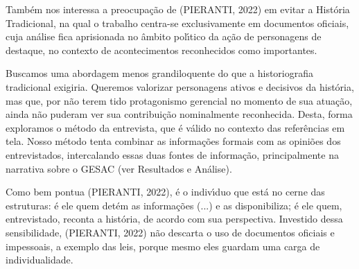 \documentclass[
12pt,		%
openright,	%
twoside,  %
a4paper,			%
chapter=TITLE,		%
english,			%
french,				%
spanish,			%
brazil				%
]{USPSC-classe/USPSC}
\begin{document}
Tamb\'em nos interessa a preocupa\c{c}\~ao de (PIERANTI, 2022) em evitar a Hist\'oria Tradicional, na qual o trabalho centra-se exclusivamente em documentos oficiais, cuja an\'alise fica aprisionada no \^ambito pol\'{\i}tico da a\c{c}\~ao de \textquotedbl personagens de destaque\textquotedbl , no contexto de \textquotedbl acontecimentos reconhecidos como importantes\textquotedbl .

















Buscamos uma abordagem menos grandiloquente do que a historiografia tradicional exigiria. Queremos valorizar personagens ativos e decisivos da hist\'oria, mas que, por n\~ao terem tido protagonismo gerencial no momento de sua atua\c{c}\~ao, ainda n\~ao puderam ver sua contribui\c{c}\~ao nominalmente reconhecida. Desta, forma exploramos o m\'etodo da entrevista, que \'e v\'alido no contexto das refer\^encias em tela. Nosso m\'etodo tenta combinar as informa\c{c}\~oes formais com as opini\~oes dos entrevistados, intercalando essas duas fontes de informa\c{c}\~ao, principalmente na narrativa sobre o GESAC (ver Resultados e An\'alise).

















Como bem pontua (PIERANTI, 2022), \textquotedbl \'e o indiv\'{\i}duo que est\'a no cerne das estruturas: \'e ele quem det\'em as informa\c{c}\~oes (...) e as disponibiliza; \'e ele quem, entrevistado, reconta a hist\'oria, de acordo com sua perspectiva\textquotedbl . Investido dessa sensibilidade,  (PIERANTI, 2022) n\~ao descarta o uso de documentos oficiais e impessoais, a exemplo das leis, porque mesmo eles \textquotedbl guardam uma carga de individualidade\textquotedbl .
\end{document}
